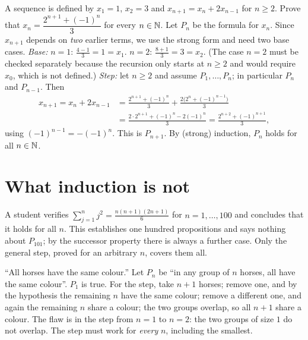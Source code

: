 \begin{example}
A sequence is defined by $x_1=1$, $x_2=3$ and $x_{n+1}=x_n+2x_{n-1}$ for $n\ge2$. Prove that $x_n=\dfrac{2^{n+1}+(-1)^n}{3}$
for every $n\in\mathbb{N}$.
\solution
Let $P_n$ be the formula for $x_n$. Since $x_{n+1}$ depends on \emph{two} earlier terms, we use the strong form and need
two base cases.
\emph{Base:} $n=1$: $\frac{4-1}{3}=1=x_1$. $n=2$: $\frac{8+1}{3}=3=x_2$. (The case $n=2$ must be checked separately
because the recursion only starts at $n\ge2$ and would require $x_0$, which is not defined.)
\emph{Step:} let $n\ge2$ and assume $P_1,\dots,P_n$; in particular $P_n$ and $P_{n-1}$. Then
\begin{align*}
x_{n+1}=x_n+2x_{n-1}&=\frac{2^{n+1}+(-1)^n}{3}+\frac{2\big(2^{n}+(-1)^{n-1}\big)}{3}\\
&=\frac{2\cdot 2^{n+1}+(-1)^n-2(-1)^{n}}{3}=\frac{2^{n+2}+(-1)^{n+1}}{3},
\end{align*}
using $(-1)^{n-1}=-(-1)^n$. This is $P_{n+1}$. By (strong) induction, $P_n$ holds for all $n\in\mathbb{N}$.
\end{example}

\section{What induction is not}\label{sec:ind-not}

\begin{warning}
A student verifies $\sum_{j=1}^{n}j^2=\frac{n(n+1)(2n+1)}6$ for $n=1,\dots,100$ and concludes that it holds for all $n$.
This establishes one hundred propositions and says nothing about $P_{101}$; by the successor property there is always a
further case. Only the general step, proved for an arbitrary $n$, covers them all.
\end{warning}

\begin{external}
``All horses have the same colour.'' Let $P_n$ be ``in any group of $n$ horses, all have the same colour''. $P_1$ is
true. For the step, take $n+1$ horses; remove one, and by the hypothesis the remaining $n$ have the same colour; remove a
different one, and again the remaining $n$ share a colour; the two groups overlap, so all $n+1$ share a colour.
The flaw is in the step from $n=1$ to $n=2$: the two groups of size $1$ do not overlap. The step must work for
\emph{every} $n$, including the smallest.
\end{external}

